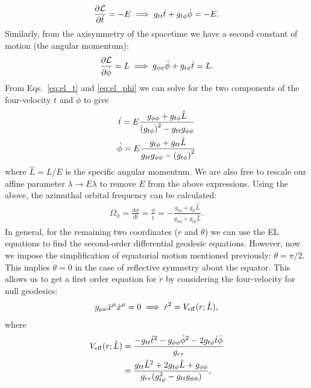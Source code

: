 \begin{equation}\label{eq:el_t} 
	\pdv{\mathcal{L}}{\dot{t}} = -E \implies g_{tt}\dot{t} + g_{t\phi}\dot{\phi} = -E.
\end{equation}
Similarly, from the axisymmetry of the spacetime we have a second constant of motion (the angular momentum):
\begin{equation}\label{eq:el_phi}
	\pdv{\mathcal{L}}{\dot{\phi}} =L \implies g_{\phi \phi}\dot{\phi} + g_{t\phi}\dot{t} = L.
\end{equation}
From Eqs.~\ref{eq:el_t} and \ref{eq:el_phi} we can solve for the two components of the four-velocity $\dot{t}$ and $\dot{\phi}$ to give
\begin{gather} \label{eq:tdot_L}
	\dot{t} = E \frac{g_{\phi \phi} + g_{t \phi}\hat{L}}{\qty(g_{t \phi})^2 - g_{t t}g_{\phi \phi}} \\
	\label{eq:phidot_L}
	\dot{\phi} = E \frac{g_{t \phi} + g_{t t}\hat{L}}{g_{t t}g_{\phi \phi} - \qty(g_{t \phi})^2}
\end{gather}
where $\hat{L} = L/E$ is the specific angular momentum.
We are also free to rescale our affine parameter $\lambda\rightarrow E\lambda$ to remove $E$ from the above expressions.
Using the above, the azimuthal orbital frequency can be calculated:
\begin{gather}
	\Omega_\phi = \frac{\mathrm{d}\phi}{\mathrm{d}t} =  \frac{\dot{\phi}}{\dot{t}} = -\frac{g_{t\phi}+g_{tt}\hat{L}}{g_{\phi\phi}+g_{t\phi}\hat{L}}.
\end{gather}
In general, for the remaining two coordinates ($r$ and $\theta$) we can use the EL equations to find the second-order differential geodesic equations.
However, now we impose the simplification of equatorial motion mentioned previously: $\theta=\pi/2$.
This implies $\dot{\theta}=0$ in the case of reflective symmetry about the equator. 
This allows us to get a first order equation for $\dot{r}$ by considering the four-velocity for null geodesics:
\begin{equation} \label{eq:rdot}
	g_{\mu\nu}\dot{x}^\mu\dot{x}^\mu = 0 \implies \dot{r}^2 = V_{\rm eff}(r;\hat{L}),
\end{equation}
where
\begin{align}\label{eq:Veff}
	V_{\rm eff}(r;\hat{L}) &= \frac{-g_{tt}\dot{t}^2 -g_{\phi\phi}\dot{\phi}^2-2g_{t\phi}\dot{t}\dot{\phi} }{g_{rr}} \nonumber \\
	&= \frac{g_{tt} \hat{L}^2+2 g_{t\phi } \hat{L}+g_{\phi\phi}}{g_{rr}(g_{t\phi}^2-g_{tt} g_{\phi \phi})},
\end{align}
